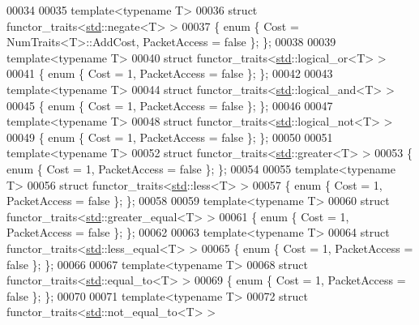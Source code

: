 \begin{DoxyCode}
00034 
00035 \textcolor{keyword}{template}<\textcolor{keyword}{typename} T>
00036 \textcolor{keyword}{struct }functor\_traits<\hyperlink{namespacestd}{std}::negate<T> >
00037 \{ \textcolor{keyword}{enum} \{ Cost = NumTraits<T>::AddCost, PacketAccess = \textcolor{keyword}{false} \}; \};
00038 
00039 \textcolor{keyword}{template}<\textcolor{keyword}{typename} T>
00040 \textcolor{keyword}{struct }functor\_traits<\hyperlink{namespacestd}{std}::logical\_or<T> >
00041 \{ \textcolor{keyword}{enum} \{ Cost = 1, PacketAccess = \textcolor{keyword}{false} \}; \};
00042 
00043 \textcolor{keyword}{template}<\textcolor{keyword}{typename} T>
00044 \textcolor{keyword}{struct }functor\_traits<\hyperlink{namespacestd}{std}::logical\_and<T> >
00045 \{ \textcolor{keyword}{enum} \{ Cost = 1, PacketAccess = \textcolor{keyword}{false} \}; \};
00046 
00047 \textcolor{keyword}{template}<\textcolor{keyword}{typename} T>
00048 \textcolor{keyword}{struct }functor\_traits<\hyperlink{namespacestd}{std}::logical\_not<T> >
00049 \{ \textcolor{keyword}{enum} \{ Cost = 1, PacketAccess = \textcolor{keyword}{false} \}; \};
00050 
00051 \textcolor{keyword}{template}<\textcolor{keyword}{typename} T>
00052 \textcolor{keyword}{struct }functor\_traits<\hyperlink{namespacestd}{std}::greater<T> >
00053 \{ \textcolor{keyword}{enum} \{ Cost = 1, PacketAccess = \textcolor{keyword}{false} \}; \};
00054 
00055 \textcolor{keyword}{template}<\textcolor{keyword}{typename} T>
00056 \textcolor{keyword}{struct }functor\_traits<\hyperlink{namespacestd}{std}::less<T> >
00057 \{ \textcolor{keyword}{enum} \{ Cost = 1, PacketAccess = \textcolor{keyword}{false} \}; \};
00058 
00059 \textcolor{keyword}{template}<\textcolor{keyword}{typename} T>
00060 \textcolor{keyword}{struct }functor\_traits<\hyperlink{namespacestd}{std}::greater\_equal<T> >
00061 \{ \textcolor{keyword}{enum} \{ Cost = 1, PacketAccess = \textcolor{keyword}{false} \}; \};
00062 
00063 \textcolor{keyword}{template}<\textcolor{keyword}{typename} T>
00064 \textcolor{keyword}{struct }functor\_traits<\hyperlink{namespacestd}{std}::less\_equal<T> >
00065 \{ \textcolor{keyword}{enum} \{ Cost = 1, PacketAccess = \textcolor{keyword}{false} \}; \};
00066 
00067 \textcolor{keyword}{template}<\textcolor{keyword}{typename} T>
00068 \textcolor{keyword}{struct }functor\_traits<\hyperlink{namespacestd}{std}::equal\_to<T> >
00069 \{ \textcolor{keyword}{enum} \{ Cost = 1, PacketAccess = \textcolor{keyword}{false} \}; \};
00070 
00071 \textcolor{keyword}{template}<\textcolor{keyword}{typename} T>
00072 \textcolor{keyword}{struct }functor\_traits<\hyperlink{namespacestd}{std}::not\_equal\_to<T> >

\end{DoxyCode}
